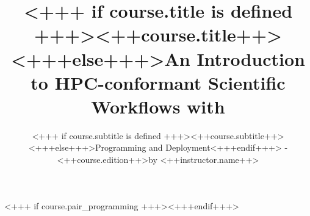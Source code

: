 \documentclass[english,xcolor=pdftex,dvipsnames,aspectratio=<+++ if course.aspectratio is defined +++><++course.aspectratio++><+++else+++>43<+++endif+++>]{beamer}
\title[<++course.shorttitle++>]{<+++ if course.title is defined +++><++course.title++><+++else+++>An Introduction to HPC-conformant Scientific Workflows with \Snakemake<+++endif+++>}
\subtitle{<+++ if course.subtitle is defined +++><++course.subtitle++><+++else+++>Programming and Deployment<+++endif+++> - <++course.edition++>\newline by <++instructor.name++>}
\begin{document}

\sloppy

\begin{frame}[plain] %
  \titlepage
\end{frame}



\ifdefined\ishandout
\else



\fi





<+++ if course.pair_programming +++><+++endif+++>













\end{document}
